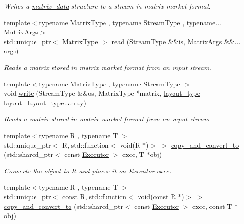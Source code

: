 \begin{DoxyCompactItemize}
\begin{DoxyCompactList}\small\item\em Writes a \hyperlink{structgko_1_1matrix__data}{matrix\+\_\+data} structure to a stream in matrix market format. \end{DoxyCompactList}\item 
{\footnotesize template$<$typename Matrix\+Type , typename Stream\+Type , typename... Matrix\+Args$>$ }\\std\+::unique\+\_\+ptr$<$ Matrix\+Type $>$ \hyperlink{namespacegko_a92cf0178c1c55419d32d2bb527e57e5b}{read} (Stream\+Type \&\&is, Matrix\+Args \&\&... args)
\begin{DoxyCompactList}\small\item\em Reads a matrix stored in matrix market format from an input stream. \end{DoxyCompactList}\item 
{\footnotesize template$<$typename Matrix\+Type , typename Stream\+Type $>$ }\\void \hyperlink{namespacegko_a859dc47a462721d83728d91ab7fa2148}{write} (Stream\+Type \&\&os, Matrix\+Type $\ast$matrix, \hyperlink{namespacegko_ae749a5ea11a93c1bcc9158d9a6e9fb68}{layout\+\_\+type} layout=\hyperlink{namespacegko_ae749a5ea11a93c1bcc9158d9a6e9fb68af1f713c9e000f5d3f280adbd124df4f5}{layout\+\_\+type\+::array})
\begin{DoxyCompactList}\small\item\em Reads a matrix stored in matrix market format from an input stream. \end{DoxyCompactList}\item 
{\footnotesize template$<$typename R , typename T $>$ }\\std\+::unique\+\_\+ptr$<$ R, std\+::function$<$ void(R $\ast$)$>$ $>$ \hyperlink{namespacegko_ac5cef6e5e9e02b8d77ce01be41117cc0}{copy\+\_\+and\+\_\+convert\+\_\+to} (std\+::shared\+\_\+ptr$<$ const \hyperlink{classgko_1_1Executor}{Executor} $>$ exec, T $\ast$obj)
\begin{DoxyCompactList}\small\item\em Converts the object to R and places it on \hyperlink{classgko_1_1Executor}{Executor} exec. \end{DoxyCompactList}\item 
{\footnotesize template$<$typename R , typename T $>$ }\\std\+::unique\+\_\+ptr$<$ const R, std\+::function$<$ void(const R $\ast$)$>$ $>$ \hyperlink{namespacegko_add859060efaa729c84788bb4f6582e9f}{copy\+\_\+and\+\_\+convert\+\_\+to} (std\+::shared\+\_\+ptr$<$ const \hyperlink{classgko_1_1Executor}{Executor} $>$ exec, const T $\ast$obj)

\end{DoxyCompactItemize}
